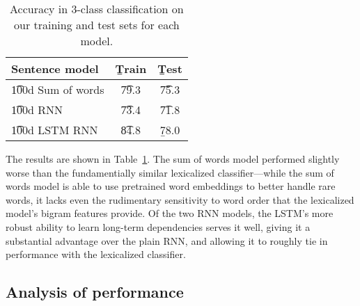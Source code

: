 \begin{table}
\begin{center}
\begin{tabular}{l@{\hskip \colspaceL}@{\hskip \colspaceL}c@{\hskip \colspaceL}c}
\toprule
\textbf{Sentence model} & \b{Train}  & \b{Test}\\
\midrule
\t{100d Sum of words}            & \t{79.3} & \t{75.3} \\

\t{100d RNN}            & \t{73.4} & \t{71.8} \\	

\t{100d LSTM RNN}            & \t{84.8} & \b{78.0} \\

\bottomrule
\end{tabular}
\end{center}
\caption{
\label{tab:nnresults}
Accuracy in 3-class classification on our training and test sets for each model.
}
\end{table}

The results are shown in Table~\ref{tab:nnresults}. The sum of words model performed slightly worse than the fundamentially similar lexicalized classifier---while the sum of words model is able to use pretrained word embeddings to better handle rare words, it lacks even the rudimentary sensitivity to word order that the lexicalized model's bigram features provide. Of the two RNN models, the LSTM's more robust ability to learn long-term dependencies serves it well, giving it a substantial advantage over the plain RNN, and allowing it to roughly tie in performance with the lexicalized classifier.

\subsection{Analysis of performance}

